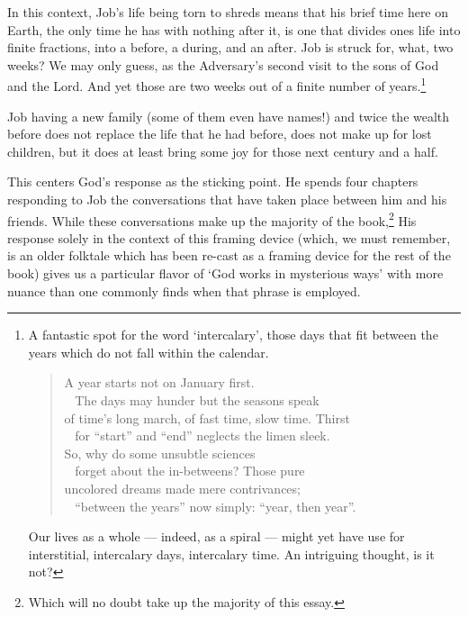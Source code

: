 In this context, Job's life being torn to shreds means that his brief time here on Earth, the only time he has with nothing after it, is one that divides ones life into finite fractions, into a before, a during, and an after. Job is struck for, what, two weeks? We may only guess, as the Adversary's second visit to the sons of God and the Lord. And yet those are two weeks out of a finite number of years.\footnote{A fantastic spot for the word `intercalary', those days that fit between the years which do not fall within the calendar.

  \begin{quote}
  A year starts not on January first.\\
  \hspace*{0.333em} ~ The days may hunder but the seasons speak\\
  of time's long march, of fast time, slow time. Thirst\\
  \hspace*{0.333em} ~ for ``start'' and ``end'' neglects the limen sleek.\\
  So, why do some unsubtle sciences\\
  \hspace*{0.333em} ~ forget about the in-betweens? Those pure\\
  uncolored dreams made mere contrivances;\\
  \hspace*{0.333em} ~ ``between the years'' now simply: ``year, then year''.

  \parencite[3]{eigengrau}
  \end{quote}

  Our lives as a whole --- indeed, as a spiral --- might yet have use for interstitial, intercalary days, intercalary time. An intriguing thought, is it not?}

Job having a new family (some of them even have names!) and twice the wealth before does not replace the life that he had before, does not make up for lost children, but it does at least bring some joy for those next century and a half.

This centers God's response as the sticking point. He spends four chapters responding to Job the conversations that have taken place between him and his friends. While these conversations make up the majority of the book,\footnote{Which will no doubt take up the majority of this essay.} His response solely in the context of this framing device (which, we must remember, is an older folktale which has been re-cast as a framing device for the rest of the book) gives us a particular flavor of `God works in mysterious ways' with more nuance than one commonly finds when that phrase is employed.

